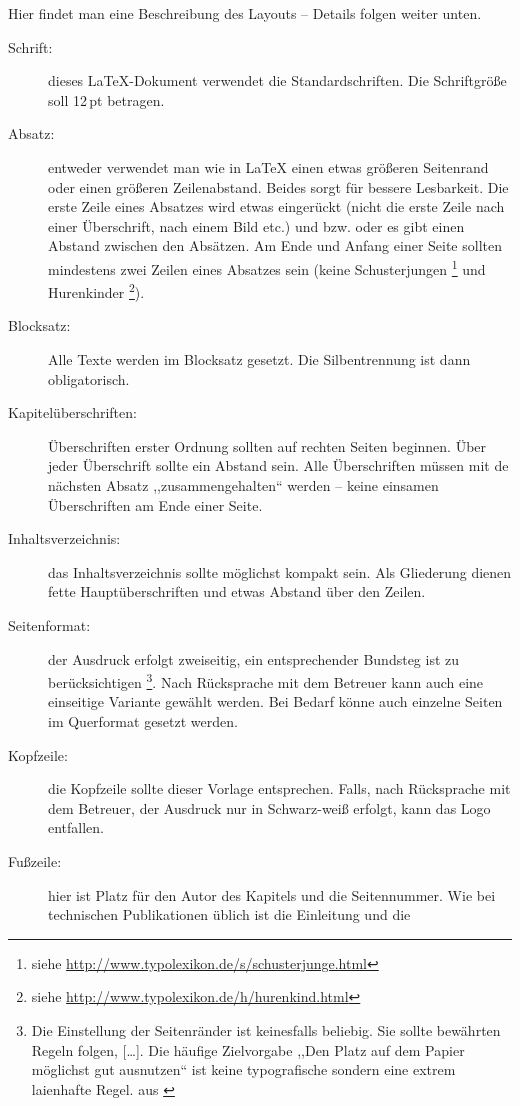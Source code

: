 \documentclass[a4paper,ngerman,naustrian,DIV=12,BCOR=1cm]{scrbook}
\begin{document}
Hier findet man eine Beschreibung des Layouts -- Details folgen weiter
unten.
\begin{description}
\item [{Schrift:}] dieses \LaTeX{}-Dokument verwendet die Standardschriften.
Die Schriftgröße soll 12\,pt betragen.
\item [{Absatz:}] entweder verwendet man wie in \LaTeX{} einen etwas größeren
Seitenrand oder einen größeren Zeilenabstand. Beides sorgt für bessere
Lesbarkeit. Die erste Zeile eines Absatzes wird etwas eingerückt (nicht
die erste Zeile nach einer Überschrift, nach einem Bild etc.) und
bzw. oder es gibt einen Abstand zwischen den Absätzen. Am Ende und
Anfang einer Seite sollten mindestens zwei Zeilen eines Absatzes sein
(keine Schusterjungen%
\footnote{siehe \url{http://www.typolexikon.de/s/schusterjunge.html}%
} und Hurenkinder%
\footnote{siehe \url{http://www.typolexikon.de/h/hurenkind.html}%
}).
\item [{Blocksatz:}] Alle Texte werden im Blocksatz gesetzt. Die Silbentrennung
ist dann obligatorisch.
\item [{Kapitelüberschriften:}] Überschriften erster Ordnung sollten auf
rechten Seiten beginnen. Über jeder Überschrift sollte ein Abstand
sein. Alle Überschriften müssen mit de nächsten Absatz ,,zusammengehalten``
werden -- keine einsamen Überschriften am Ende einer Seite.
\item [{Inhaltsverzeichnis:}] das Inhaltsverzeichnis sollte möglichst kompakt
sein. Als Gliederung dienen fette Hauptüberschriften und etwas Abstand
über den Zeilen.
\item [{Seitenformat:}] der Ausdruck erfolgt zweiseitig, ein entsprechender
Bundsteg ist zu berücksichtigen%
\footnote{Die Einstellung der Seitenränder ist keinesfalls beliebig. Sie sollte
bewährten Regeln folgen, {[}\ldots{}{]}. Die häufige Zielvorgabe
,,Den Platz auf dem Papier möglichst gut ausnutzen`` ist keine typografische
sondern eine extrem laienhafte Regel. aus \cite{layout}%
}. Nach Rücksprache mit dem Betreuer kann auch eine einseitige Variante
gewählt werden. Bei Bedarf könne auch einzelne Seiten im Querformat
gesetzt werden.
\item [{Kopfzeile:}] die Kopfzeile sollte dieser Vorlage entsprechen. Falls,
nach Rücksprache mit dem Betreuer, der Ausdruck nur in Schwarz-weiß
erfolgt, kann das Logo entfallen.
\item [{Fußzeile:}] hier ist Platz für den Autor des Kapitels und die Seitennummer.
Wie bei technischen Publikationen üblich ist die Einleitung und die

\end{description}
\end{document}
